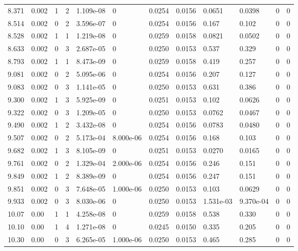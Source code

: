 \documentclass[preview]{standalone}
\begin{document}
{{{\begin{tabular}{L{1.2cm}C{1.2cm} C{0.3cm}C{0.5cm} C{1.4cm}C{1.4cm} C{1.4cm}C{1.4cm} C{1.6cm}C{1.6cm} C{1.6cm}C{1.6cm}}
  8.371  &  0.002  & 1     &  2 &  1.109e-08  & 0  &  0.0254&   0.0156& 0.0651 & 0.0398   &  0 & 0  \\ 
  8.514  &  0.002  & 0     &  2 &  3.596e-07  & 0  &  0.0254&   0.0156& 0.167 & 0.102   &  0 & 0  \\ 
  8.528  &  0.002  & 1     &  1 &  1.219e-08  & 0  &  0.0259&   0.0158& 0.0821 & 0.0502   &  0 & 0  \\ 
  8.633  &  0.002  & 0     &  3 &  2.687e-05  & 0  &  0.0250&   0.0153& 0.537 & 0.329   &  0 & 0  \\ 
  8.793  &  0.002  & 1     &  1 &  8.473e-09  & 0  &  0.0259&   0.0158& 0.419 & 0.257   &  0 & 0  \\ 
  9.081  &  0.002  & 0     &  2 &  5.095e-06  & 0  &  0.0254&   0.0156& 0.207 & 0.127   &  0 & 0  \\ 
  9.083  &  0.002  & 0     &  3 &  1.141e-05  & 0  &  0.0250&   0.0153& 0.631 & 0.386   &  0 & 0  \\ 
  9.300  &  0.002  & 1     &  3 &  5.925e-09  & 0  &  0.0251&   0.0153& 0.102 & 0.0626   &  0 & 0  \\ 
  9.322  &  0.002  & 0     &  3 &  1.209e-05  & 0  &  0.0250&   0.0153& 0.0762 & 0.0467   &  0 & 0  \\ 
  9.490  &  0.002  & 1     &  2 &  3.432e-08  & 0  &  0.0254&   0.0156& 0.0783 & 0.0480   &  0 & 0  \\ 
  9.507  &  0.002  & 0     &  2 &  5.173e-04  & 8.000e-06  &  0.0254&   0.0156& 0.168 & 0.103   &  0 & 0  \\ 
  9.682  &  0.002  & 1     &  3 &  8.105e-09  & 0  &  0.0251&   0.0153& 0.0270 & 0.0165   &  0 & 0  \\ 
  9.761  &  0.002  & 0     &  2 &  1.329e-04  & 2.000e-06  &  0.0254&   0.0156& 0.246 & 0.151   &  0 & 0  \\ 
  9.849  &  0.002  & 1     &  2 &  8.389e-09  & 0  &  0.0254&   0.0156& 0.247 & 0.151   &  0 & 0  \\ 
  9.851  &  0.002  & 0     &  3 &  7.648e-05  & 1.000e-06  &  0.0250&   0.0153& 0.103 & 0.0629   &  0 & 0  \\ 
  9.933  &  0.002  & 0     &  3 &  8.030e-06  & 0  &  0.0250&   0.0153& 1.531e-03 & 9.370e-04   &  0 & 0  \\ 
  10.07  &  0.00  & 1     &  1 &  4.258e-08  & 0  &  0.0259&   0.0158& 0.538 & 0.330   &  0 & 0  \\ 
  10.10  &  0.00  & 1     &  4 &  1.271e-08  & 0  &  0.0245&   0.0150& 0.335 & 0.205   &  0 & 0  \\ 
  10.30  &  0.00  & 0     &  3 &  6.265e-05  & 1.000e-06  &  0.0250&   0.0153& 0.465 & 0.285   &  0 & 0  \\ 

\end{tabular}}}}
\end{document}
